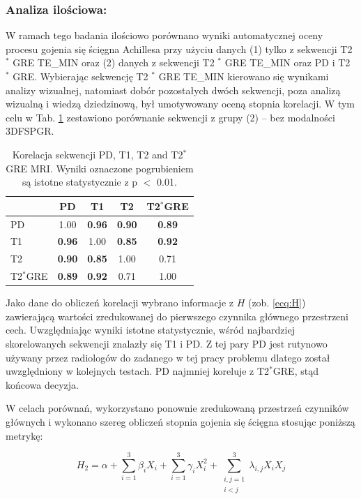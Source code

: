 \subsubsection{Analiza ilościowa:} W ramach tego badania ilościowo porównano wyniki automatycznej oceny procesu gojenia się ścięgna Achillesa przy użyciu danych (1) tylko z sekwencji T2 $^\ast$ GRE TE\_MIN oraz (2) danych z sekwencji T2 $^\ast$ GRE TE\_MIN oraz PD i T2 $^\ast$ GRE. Wybierając sekwencję T2 $^\ast$ GRE TE\_MIN kierowano się wynikami analizy wizualnej, natomiast dobór pozostałych dwóch sekwencji, poza analizą wizualną i wiedzą dziedzinową, był umotywowany oceną stopnia korelacji. W tym celu w Tab. \ref{tab:inter-protocol-corr} zestawiono porównanie sekwencji z grupy (2) -- bez modalności 3DFSPGR.

\begin{table}[h]
	\centering
	\setlength{\tabcolsep}{12pt}
	\caption{Korelacja sekwencji PD, T1, T2 and T2$^\ast$ GRE MRI. Wyniki oznaczone pogrubieniem są istotne statystycznie z p $<$ 0.01.}
	\label{tab:inter-protocol-corr}
	\begin{tabular}{l||c|c|c|c}
		& PD & T1 & T2 & T2$^\ast$GRE \\ \hline \hline
		PD & 1.00 & \textbf{0.96} & \textbf{0.90} & \textbf{0.89} \\ \hline
		T1 & \textbf{0.96} & 1.00 & \textbf{0.85} & \textbf{0.92} \\ \hline
		T2 & \textbf{0.90} & \textbf{0.85} & 1.00 & 0.71 \\ \hline
		T2$^\ast$GRE & \textbf{0.89} & \textbf{0.92} & 0.71 & 1.00  %
	\end{tabular}
\end{table} 

Jako dane do obliczeń korelacji wybrano informacje z $H$ (zob. \ref{ecq:H}) zawierającą wartości zredukowanej do pierwszego czynnika głównego przestrzeni cech.  Uwzględniając wyniki istotne statystycznie, wśród najbardziej skorelowanych sekwencji znalazły się T1 i PD. Z tej pary PD jest rutynowo używany przez radiologów do zadanego w tej pracy problemu dlatego został uwzględniony w kolejnych testach. PD najmniej koreluje z T2$^\ast$GRE, stąd końcowa decyzja.

W celach porównań, wykorzystano ponownie zredukowaną przestrzeń czynników głównych i wykonano szereg obliczeń stopnia gojenia się ścięgna stosując poniższą metrykę: 

\begin{equation}
H_{2} = \alpha + \sum_{i=1}^{3}\beta_{i}X_{i} + \sum_{i=1}^{3}\gamma_{i}X_{i}^{2} +
\sum_{\substack{i, j = 1\\ i < j}}^{3}\lambda_{i,j}X_{i}X_{j}
\end{equation}

